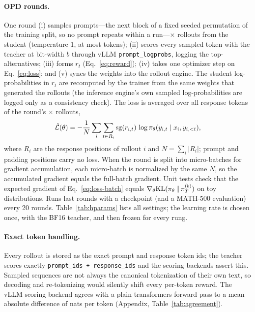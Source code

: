 \paragraph{OPD rounds.} One round (i) samples \nPrompts{} prompts---the next block of a fixed
seeded permutation of the training split, so no prompt repeats within a run---$\times$
\nRollouts{} rollouts from the student (temperature 1, at most \rolloutMaxTok{} tokens); (ii) scores every
sampled token with the teacher at bit-width $b$ through vLLM \citep{kwon2023vllm}
\texttt{prompt\_logprobs}, logging the top-\teacherTopK{} alternatives; (iii) forms
$r_t$ (Eq.~\ref{eq:reward}); (iv) takes one optimizer step on Eq.~\ref{eq:loss}; and (v) syncs
the weights into the rollout engine. The student log-probabilities in $r_t$ are recomputed by
the trainer from the same weights that generated the rollouts (the inference engine's own
sampled log-probabilities are logged only as a consistency check). The loss is averaged over all response tokens of the
round's \nPrompts{}$\times$\nRollouts{} rollouts,
\begin{equation}
  \hat{\mathcal{L}}(\theta) = -\frac{1}{N}\sum_{i}\sum_{t\in R_i} \operatorname{sg}(r_{i,t})\,
  \log\pi_\theta(y_{i,t}\mid x_i, y_{i,<t}),
  \label{eq:loss-batch}
\end{equation}
where $R_i$ are the response positions of rollout $i$ and $N=\sum_i|R_i|$; prompt and padding
positions carry no loss. When the round is split into micro-batches for gradient accumulation,
each micro-batch is normalized by the same $N$, so the accumulated gradient equals the
full-batch gradient. Unit tests check that the expected gradient of Eq.~\ref{eq:loss-batch}
equals $\nabla_\theta\mathrm{KL}(\pi_\theta\,\|\,\pi_T^{(b)})$ on toy distributions. Runs last \nRounds{} rounds with a checkpoint (and a
MATH-500 evaluation) every 20 rounds. Table~\ref{tab:hparams} lists all settings; the learning
rate is chosen once, with the BF16 teacher, and then frozen for every rung.

\paragraph{Exact token handling.} Every rollout is stored as the exact prompt and response token
ids; the teacher scores exactly \texttt{prompt\_ids + response\_ids} and the scoring backends
assert this. Sampled sequences are not always the canonical tokenization of their own text, so
decoding and re-tokenizing would silently shift every per-token reward. The vLLM scoring backend
agrees with a plain transformers forward pass to a mean absolute difference of
\agreeMeanAbs{} nats per token (Appendix, Table~\ref{tab:agreement}).

